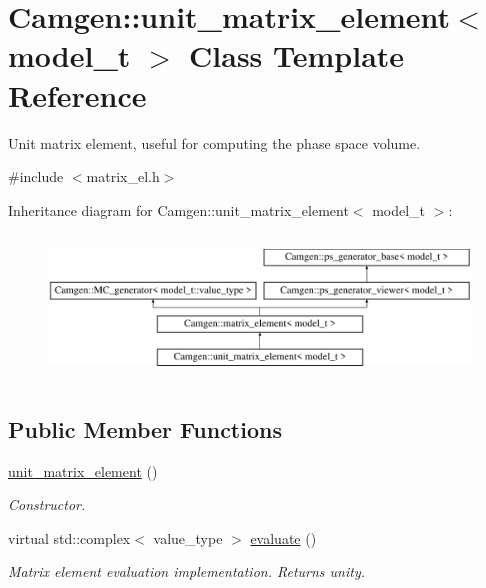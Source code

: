 \hypertarget{a00553}{\section{Camgen\-:\-:unit\-\_\-matrix\-\_\-element$<$ model\-\_\-t $>$ Class Template Reference}
\label{a00553}
}


Unit matrix element, useful for computing the phase space volume.  




{\ttfamily \#include $<$matrix\-\_\-el.\-h$>$}

Inheritance diagram for Camgen\-:\-:unit\-\_\-matrix\-\_\-element$<$ model\-\_\-t $>$\-:\begin{figure}[H]
\begin{center}
\leavevmode
\includegraphics[height=3.875432cm]{a00553}
\end{center}
\end{figure}
\subsection*{Public Member Functions}
\begin{DoxyCompactItemize}
\item 
\hypertarget{a00553_a425d1091a6cdd135d8a329305cd843df}{\hyperlink{a00553_a425d1091a6cdd135d8a329305cd843df}{unit\-\_\-matrix\-\_\-element} ()}\label{a00553_a425d1091a6cdd135d8a329305cd843df}

\begin{DoxyCompactList}\small\item\em Constructor. \end{DoxyCompactList}\item 
\hypertarget{a00553_a63386092eb9ec18ef6e7e1a5859b0a7a}{virtual std\-::complex$<$ value\-\_\-type $>$ \hyperlink{a00553_a63386092eb9ec18ef6e7e1a5859b0a7a}{evaluate} ()}\label{a00553_a63386092eb9ec18ef6e7e1a5859b0a7a}

\begin{DoxyCompactList}\small\item\em Matrix element evaluation implementation. Returns unity. \end{DoxyCompactList}\end{DoxyCompactItemize}
